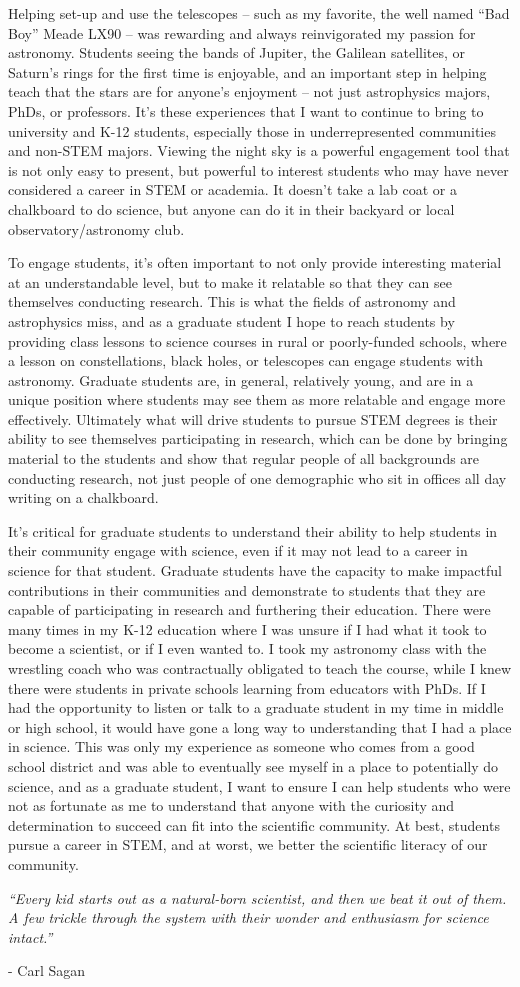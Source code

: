 \documentclass[11pt,letterpaper]{article}
\begin{document}
Helping set-up and use the telescopes -- such as my favorite, the well named “Bad Boy” Meade LX90 -- was rewarding and always reinvigorated my passion for astronomy. Students seeing the bands of Jupiter, the Galilean satellites, or Saturn’s rings for the first time is enjoyable, and an important step in helping teach that the stars are for anyone’s enjoyment -- not just astrophysics majors, PhDs, or professors. It’s these experiences that I want to continue to bring to university and K-12 students, especially those in underrepresented communities and non-STEM majors. Viewing the night sky is a powerful engagement tool that is not only easy to present, but powerful to interest students who may have never considered a career in STEM or academia. It doesn’t take a lab coat or a chalkboard to do science, but anyone can do it in their backyard or local observatory/astronomy club.  

To engage students, it's often important to not only provide interesting material at an understandable level, but to make it relatable so that they can see themselves conducting research. This is what the fields of astronomy and astrophysics miss, and as a graduate student I hope to reach students by providing class lessons to science courses in rural or poorly-funded schools, where a lesson on constellations, black holes, or telescopes can engage students with astronomy. Graduate students are, in general, relatively young, and are in a unique position where students may see them as more relatable and engage more effectively. Ultimately what will drive students to pursue STEM degrees is their ability to see themselves participating in research, which can be done by bringing material to the students and show that regular people of all backgrounds are conducting research, not just people of one demographic who sit in offices all day writing on a chalkboard.

It’s critical for graduate students to understand their ability to help students in their community engage with science, even if it may not lead to a career in science for that student. Graduate students have the capacity to make impactful contributions in their communities and demonstrate to students that they are capable of participating in research and furthering their education. There were many times in my K-12 education where I was unsure if I had what it took to become a scientist, or if I even wanted to. I took my astronomy class with the wrestling coach who was contractually obligated to teach the course, while I knew there were students in private schools learning from educators with PhDs. If I had the opportunity to listen or talk to a graduate student in my time in middle or high school, it would have gone a long way to understanding that I had a place in science. This was only my experience as someone who comes from a good school district and was able to eventually see myself in a place to potentially do science, and as a graduate student, I want to ensure I can help students who were not as fortunate as me to understand that anyone with the curiosity and determination to succeed can fit into the scientific community. At best, students pursue a career in STEM, and at worst, we better the scientific literacy of our community.

\textit{“Every kid starts out as a natural-born scientist, and then we beat it out of them. A few trickle through the system with their wonder and enthusiasm for science intact.”}

- Carl Sagan
\end{document}
